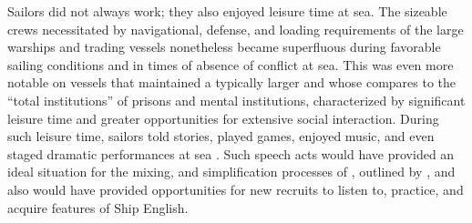 Sailors did not always work; they also enjoyed leisure time at sea. The sizeable crews necessitated by navigational, defense, and loading requirements of the large warships and  trading vessels nonetheless became superfluous during favorable sailing conditions and in times of absence of conflict at sea. This was even more notable on  vessels that maintained a typically larger  and whose  \citet{Burg2001} compares to the “total institutions” of prisons and mental institutions, characterized by significant leisure time and greater opportunities for extensive social interaction. During such leisure time, sailors told stories, played games, enjoyed music, and even staged dramatic performances at sea \citep[155]{Rediker2004}. Such speech acts would have provided an ideal situation for the mixing,  and simplification processes of , outlined by \citet{Trudgill1986}, and also would have provided opportunities for new recruits to listen to, practice, and acquire features of Ship English.

\begin{figure}

\end{figure}

